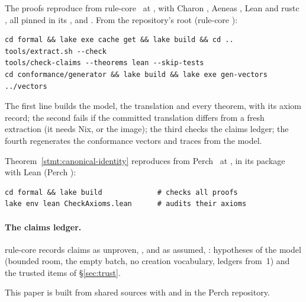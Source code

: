 The proofs reproduce from rule-core~\cite{rule-core} at
, with Charon , Aeneas
, Lean  and rustc
, all pinned in its ,
 and . From the
repository's root (rule-core ):
\begin{Verbatim}[fontsize=\footnotesize,xleftmargin=1em]
cd formal && lake exe cache get && lake build && cd ..
tools/extract.sh --check
tools/check-claims --theorems lean --skip-tests
cd conformance/generator && lake build && lake exe gen-vectors ../vectors
\end{Verbatim}
The first line builds the model, the translation and every theorem, with its
axiom record; the second fails if the committed translation differs from a fresh
extraction (it needs Nix, or the  image); the third checks the
claims ledger; the fourth regenerates the conformance vectors and traces from the
model.

Theorem~\ref{stmt:canonical-identity} reproduces from Perch~\cite{perch-src} at
, in its  package with Lean
 (Perch ):
\begin{Verbatim}[fontsize=\footnotesize,xleftmargin=1em]
cd formal && lake build             # checks all proofs
lake env lean CheckAxioms.lean      # audits their axioms
\end{Verbatim}
\paragraph{The claims ledger.} rule-core records  claims
as unproven, , and  as assumed,
: hypotheses of the model (bounded room, the empty
batch, no creation vocabulary, ledgers from~1) and the trusted items of
\S\ref{sec:trust}.

\noindent This paper is built from shared sources with
  and
 in the Perch repository.

